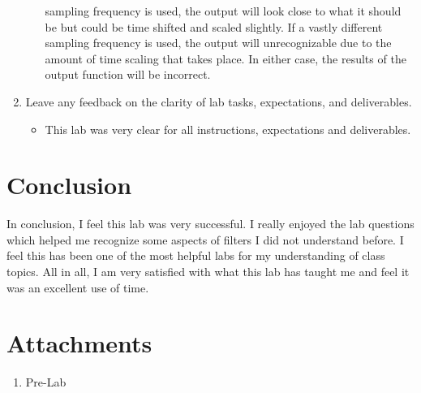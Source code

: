 \documentclass[12pt]{report}
\begin{document}
\begin{enumerate}
\begin{itemize}
    sampling frequency is used, the output will look close to what it should be but could be time shifted and scaled slightly. If a vastly different
    sampling frequency is used, the output will unrecognizable due to the amount of time scaling that takes place. In either case, the results of
    the output function will be incorrect.
  \end{itemize}
  \item Leave any feedback on the clarity of lab tasks, expectations, and deliverables.
  \begin{itemize}
    \item This lab was very clear for all instructions, expectations and deliverables.
  \end{itemize}
\end{enumerate}
\section{Conclusion}
In conclusion, I feel this lab was very successful. I really enjoyed the lab questions which helped me recognize some aspects of filters I did not understand before.
I feel this has been one of the most helpful labs for my understanding of class topics. All in all, I am very satisfied with what this lab has taught me and feel it was an 
excellent use of time.
\newpage
\thispagestyle{customblank}
\section{Attachments}\label{section: Attachments}
\centering\begin{enumerate}
  \item Pre-Lab
\end{enumerate}
\vspace*{\fill}


% 


\end{document}

